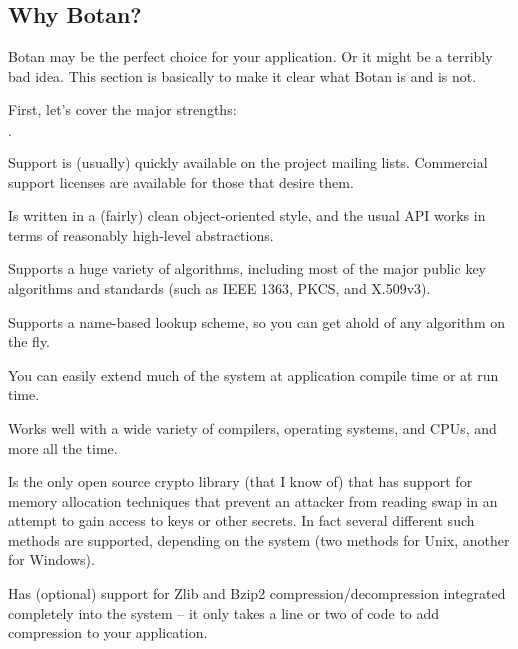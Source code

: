 \documentclass{article}
\begin{document}
\subsection{Why Botan?}

Botan may be the perfect choice for your application. Or it might be a
terribly bad idea. This section is basically to make it clear what Botan is
and is not.

First, let's cover the major strengths:

\begin{list}{$\cdot$}
  \item Support is (usually) quickly available on the project mailing lists.
        Commercial support licenses are available for those that desire them.

  \item
  \item Is written in a (fairly) clean object-oriented style, and the usual
        API works in terms of reasonably high-level abstractions.

  \item Supports a huge variety of algorithms, including most of the major
        public key algorithms and standards (such as IEEE 1363, PKCS, and
        X.509v3).

  \item Supports a name-based lookup scheme, so you can get ahold of any
        algorithm on the fly.

  \item You can easily extend much of the system at application compile time or
        at run time.

  \item Works well with a wide variety of compilers, operating systems, and
        CPUs, and more all the time.

  \item Is the only open source crypto library (that I know of) that has
        support for memory allocation techniques that prevent an attacker from
        reading swap in an attempt to gain access to keys or other secrets. In
        fact several different such methods are supported, depending on the
        system (two methods for Unix, another for Windows).

  \item Has (optional) support for Zlib and Bzip2 compression/decompression
        integrated completely into the system -- it only takes a line or two of
        code to add compression to your application.
\end{list}
\end{document}
